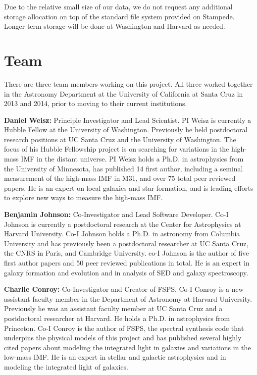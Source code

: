 \documentclass[11pt,preprint]{aastex}
\begin{document}
Due to the relative small size of our data, we do not request any additional storage allocation on top of the standard file system provided on Stampede.  Longer term storage will be done at Washington and Harvard as needed.





\section{Team}

There are three team members working on this project.  All three worked together in the Astronomy Department at the University of California at Santa Cruz in 2013 and 2014, prior to moving to their current institutions.

\textbf{Daniel Weisz:}  Principle Investigator and Lead Scientist.  PI Weisz is currently a Hubble Fellow at the University of Washington.  Previously he held postdoctoral research positions at UC Santa Cruz and the University of Washington.  The focus of his Hubble Fellowship project is on searching for variations in the high-mass IMF in the distant universe.  PI Weisz holds a Ph.D. in astrophysics from the University of Minnesota, has published 14 first author, including a seminal measurement of the high-mass IMF in M31, and over 75 total peer reviewed papers. He is an expert on local galaxies and star-formation, and is leading efforts to explore new ways to measure the high-mass IMF.  

\textbf{Benjamin Johnson:} Co-Investigator and Lead Software Developer.  Co-I Johnson is currently a postdoctoral research at the Center for Astrophysics at Harvard University.  Co-I Johnson holds a Ph.D. in astronomy from Columbia University and has previously been a postdoctoral researcher at UC Santa Cruz, the CNRS in Paris, and Cambridge University.  co-I Johnson is the author of five first author papers and 50 peer reviewed publications in total.  He is an expert in galaxy formation and evolution and in analysis of SED and galaxy spectroscopy.  

\textbf{Charlie Conroy:}  Co-Investigator and Creator of FSPS.  Co-I Conroy is a new assistant faculty member in the Department of Astronomy at Harvard University.  Previously he was an assistant faculty member at UC Santa Cruz and a postdoctoral researcher at Harvard. He holds a Ph.D. in astrophysics from Princeton.  Co-I Conroy is the author of FSPS, the spectral synthesis code that underpins the physical models of this project and has published several highly cited papers about modeling the integrated light in galaxies and variations in the low-mass IMF.  He is an expert in stellar and galactic astrophysics and in modeling the integrated light of galaxies. 





%
\end{document}
